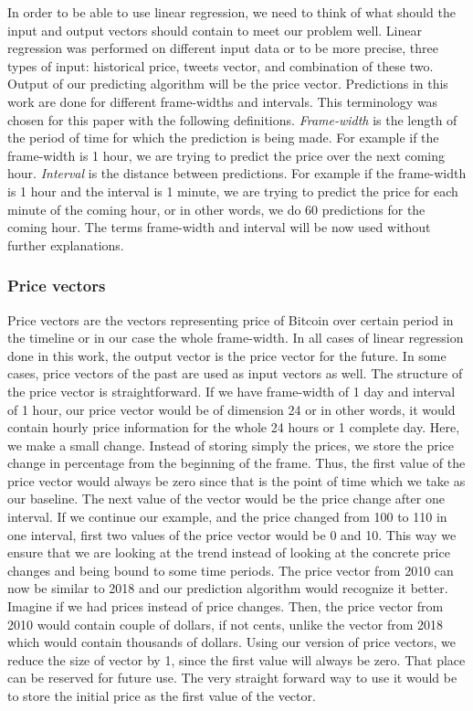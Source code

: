 \documentclass[a4paper,11pt,oneside]{article}
\begin{document}
  In order to be able to use linear regression, we need to think of what should the input and output vectors should contain to meet our problem well. Linear regression was performed on different input data or to be more precise, three types of input: historical price, tweets vector, and combination of these two. Output of our predicting algorithm will be the price vector. Predictions in this work are done for different frame-widths and intervals. This terminology was chosen for this paper with the following definitions. {\it Frame-width} is the length of the period of time for which the prediction is being made. For example if the frame-width is 1 hour, we are trying to predict the price over the next coming hour. {\it Interval} is the distance between predictions. For example if the frame-width is 1 hour and the interval is 1 minute, we are trying to predict the price for each minute of the coming hour, or in other words, we do 60 predictions for the coming hour. The terms frame-width and interval will be now used without further explanations. 
  
  \subsubsection{Price vectors}\label{pricevectors}
  
  Price vectors are the vectors representing price of Bitcoin over certain period in the timeline or in our case the whole frame-width. In all cases of linear regression done in this work, the output vector is the price vector for the future. In some cases, price vectors of the past are used as input vectors as well. The structure of the price vector is straightforward. If we have frame-width of 1 day and interval of 1 hour, our price vector would be of dimension 24 or in other words, it would contain hourly price information for the whole 24 hours or 1 complete day. Here, we make a small change. Instead of storing simply the prices, we store the price change in percentage from the beginning of the frame. Thus, the first value of the price vector would always be zero since that is the point of time which we take as our baseline. The next value of the vector would be the price change after one interval. If we continue our example, and the price changed from 100 to 110 in one interval, first two values of the price vector would be 0 and 10. This way we ensure that we are looking at the trend instead of looking at the concrete price changes and being bound to some time periods. The price vector from 2010 can now be similar to 2018 and our prediction algorithm would recognize it better. Imagine if we had prices instead of price changes. Then, the price vector from 2010 would contain couple of dollars, if not cents, unlike the vector from 2018 which would contain thousands of dollars. Using our version of price vectors, we reduce the size of vector by 1, since the first value will always be zero. That place can be reserved for future use. The very straight forward way to use it would be to store the initial price as the first value of the vector.
  
\end{document}
